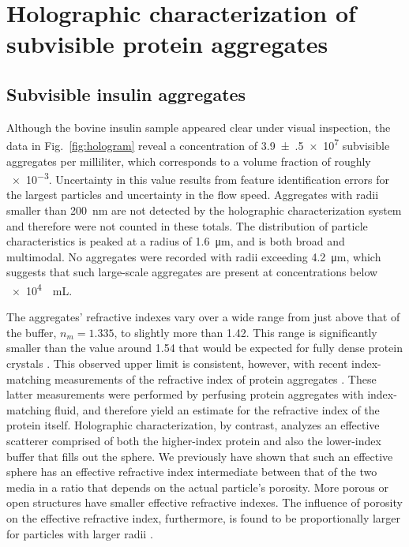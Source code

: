 \section{Holographic characterization of subvisible protein aggregates}

\subsection{Subvisible insulin aggregates}
\label{sec:insulin}

Although the bovine insulin sample appeared clear under visual inspection,
the data in Fig.~\ref{fig:hologram} reveal
a concentration of \num{3.9(5)e7} subvisible aggregates per milliliter,
which corresponds to a volume fraction of roughly \num{e-3}.
Uncertainty in this value results from feature identification errors
for the largest particles and uncertainty in the flow speed.
Aggregates with radii smaller than \SI{200}{\nm} are not detected
by the holographic characterization system 
and therefore were not counted in these totals.
The distribution of particle characteristics is peaked at a radius of
\SI{1.6}{\um}, and is both broad and multimodal.
No aggregates were recorded with radii exceeding \SI{4.2}{\um},
which suggests that such large-scale aggregates are present
at concentrations below \SI{e4}{\per\mL}.

The aggregates' refractive indexes vary over a wide range
from just above that of the buffer, $n_m = \num{1.335}$, 
to slightly more than \num{1.42}.
This range is significantly smaller
than the value around \num{1.54} that would be expected 
for fully dense protein crystals \cite{maschke06}.  
This observed upper limit is consistent, however, 
with recent index-matching
measurements of the refractive index of protein aggregates
\cite{zolls13}.
These latter measurements were performed by perfusing
protein aggregates with index-matching fluid,
and therefore yield an estimate for the refractive index
of the protein itself.
Holographic characterization, by contrast, analyzes an
effective scatterer comprised of both the higher-index
protein and also the lower-index buffer that fills out the sphere.
We previously have shown that such an effective sphere
has an effective refractive index intermediate between that
of the two media \cite{cheong11} in a ratio that depends
on the actual particle's porosity.  More porous or open structures
have smaller effective refractive indexes.
The influence of porosity on the effective refractive index,
furthermore, is found to be proportionally larger for particles 
with larger radii \cite{cheong11}.

